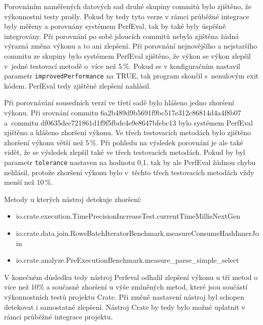 Porovnáním naměřených datových sad druhé skupiny commitů bylo zjištěno, že výkonnostní testy prošly.
Pokud by tedy tyto verze v rámci průběžné integrace byly měřeny a porovnány systémem PerfEval, tak by také byly úspěšně integrovány.
Při porovnání po sobě jdoucích commitů nebyla zjištěna žádná výrazná změna výkonu a to ani zlepšení.
Při porovnání nejnovějšího a nejstaršího commitu ze skupiny bylo systémem PerfEval zjištěno, že výkon se výkon zlepšil
v~jedné testovací metodě o~více než 5\,\%.
Pokud se v konfiguračním nastavil parametr \lstinline{improvedPerformance} na TRUE, tak program skončil s~nenulovým exit kódem.
PerfEval tedy zjištěné zlepšení nahlásil.

Při porovnávání sousedních verzí ve třetí sadě bylo hlášeno jedno zhoršení výkonu.
Při srovnání commitu 6a2b489d9b5691f9bc517e312c86814d4a4f8b07 a~commitu df0635dec721861d1f9f5fbde4e9e8647bfebc13
bylo systémem PerfEval zjištěno a hlášeno zhoršení výkonu. Ve třech testovacích metodách bylo zjištěno zhoršení výkonu
větší než 5\,\%. Při pohledu na výsledek porovnání je ale také vidět, že se výsledek zlepšil také ve třech testovacích metodách.
Pokud by byl parametr \lstinline{tolerance} nastaven na hodnotu 0,1, tak by ale PerfEval žádnou chybu nehlásil, protože
zhoršení výkonu bylo v~těchto třech testovacích metodách vždy menší než 10\,\%.

Metody u kterých nástroj detekuje zhoršení:
\begin{itemize}
    \item io.crate.execution.TimePrecisionIncreaseTest.currentTimeMillisNextGen
    \item io.crate.data.join.\-RowsBatchIteratorBenchmark.measureConsumeHash\linebreak InnerJoin
    \item io.crate.analyze.PreExecutionBenchmark.measure\_parse\_simple\_select
\end{itemize}

V konečném důsledku tedy nástroj Perfeval odhalil zlepšení výkonu u tří metod o více než 10\.\% a současně zhoršení u výše zmíněných metod, které jsou
součástí výkonnostních testů projektu Crate. Při změně nastavení nástroj byl schopen detekovat i samostatné zlepšení.
Nástroj Crate by tedy bylo možné uplatnit v rámci průběžné integrace projektu.

